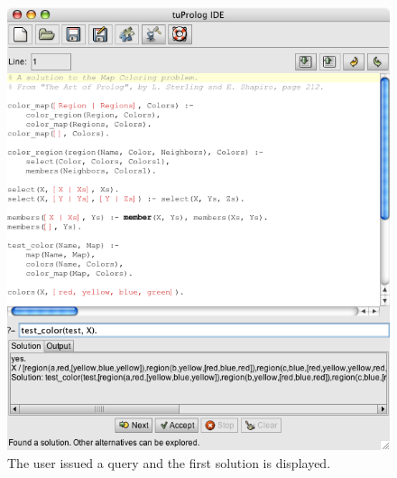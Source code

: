 \begin{figure}
\centering
\includegraphics[scale=0.605]{images/queryIssued}
\caption{The user issued a query  and the first solution is displayed.}
\label{query-issued}
\end{figure}

